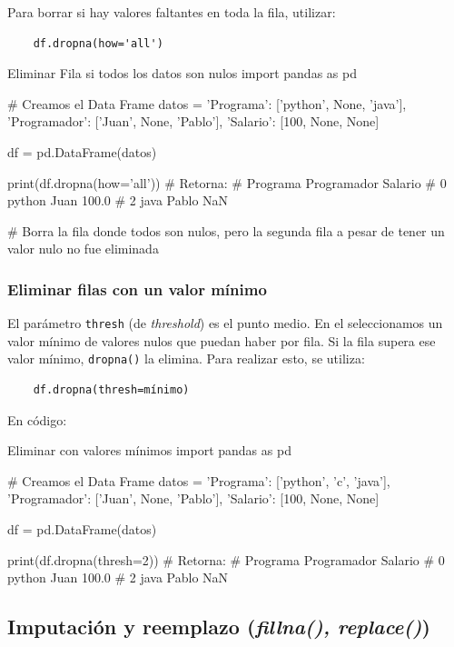 Para borrar si hay valores faltantes en toda la fila, utilizar:
\begin{verbatim}
    df.dropna(how='all')
\end{verbatim}

\begin{pycode}{Eliminar Fila si todos los datos son nulos}
import pandas as pd

# Creamos el Data Frame
datos = {
    'Programa': ['python', None, 'java'],
    'Programador': ['Juan', None, 'Pablo'],
    'Salario': [100, None, None]
}    

df = pd.DataFrame(datos)

print(df.dropna(how='all')) # Retorna:
#   Programa Programador  Salario
# 0   python        Juan    100.0
# 2     java       Pablo      NaN

# Borra la fila donde todos son nulos, pero la segunda fila a pesar de tener un valor nulo no fue eliminada

\end{pycode}

\subsubsection{Eliminar filas con un valor mínimo}

El parámetro \texttt{thresh} (de \textit{threshold}) es el punto medio. En el seleccionamos un valor mínimo de valores nulos que puedan haber por fila. Si la fila supera ese valor mínimo, \texttt{dropna()} la elimina. Para realizar esto, se utiliza:
\begin{verbatim}
    df.dropna(thresh=mínimo)
\end{verbatim}

En código:
\begin{pycode}{Eliminar con valores mínimos}
import pandas as pd

# Creamos el Data Frame
datos = {
    'Programa': ['python', 'c', 'java'],
    'Programador': ['Juan', None, 'Pablo'],
    'Salario': [100, None, None]
}    

df = pd.DataFrame(datos)

print(df.dropna(thresh=2)) # Retorna:
#   Programa Programador  Salario
# 0   python        Juan    100.0
# 2     java       Pablo      NaN    
\end{pycode}





\subsection{Imputación y reemplazo (\textit{fillna(), replace()})}

